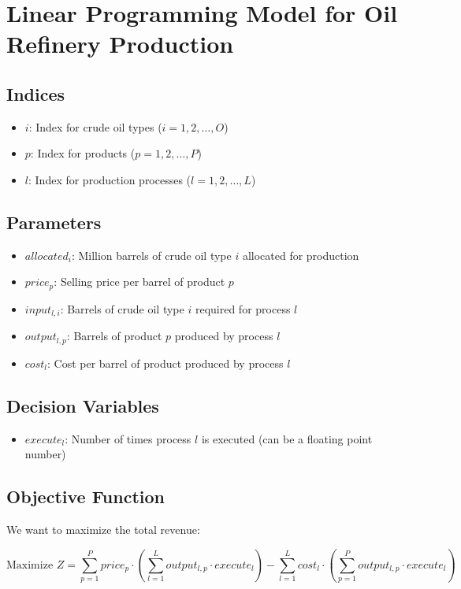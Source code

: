 \documentclass{article}
\begin{document}
\section*{Linear Programming Model for Oil Refinery Production}

\subsection*{Indices}
\begin{itemize}
    \item $i$: Index for crude oil types ($i = 1, 2, \ldots, O$)
    \item $p$: Index for products ($p = 1, 2, \ldots, P$)
    \item $l$: Index for production processes ($l = 1, 2, \ldots, L$)
\end{itemize}

\subsection*{Parameters}
\begin{itemize}
    \item $allocated_i$: Million barrels of crude oil type $i$ allocated for production
    \item $price_p$: Selling price per barrel of product $p$
    \item $input_{l,i}$: Barrels of crude oil type $i$ required for process $l$
    \item $output_{l,p}$: Barrels of product $p$ produced by process $l$
    \item $cost_l$: Cost per barrel of product produced by process $l$
\end{itemize}

\subsection*{Decision Variables}
\begin{itemize}
    \item $execute_l$: Number of times process $l$ is executed (can be a floating point number)
\end{itemize}

\subsection*{Objective Function}
We want to maximize the total revenue:

\[
\text{Maximize } Z = \sum_{p=1}^{P} price_p \cdot \left( \sum_{l=1}^{L} output_{l,p} \cdot execute_l \right) - \sum_{l=1}^{L} cost_l \cdot \left( \sum_{p=1}^{P} output_{l,p} \cdot execute_l \right)
\]
\end{document}
